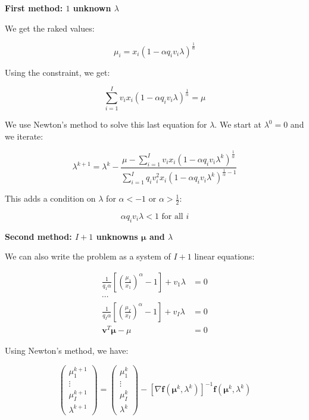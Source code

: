 \documentclass{tex/note}
\begin{document}
\textbf{First method: $1$ unknown $\lambda$}

We get the raked values:

\begin{equation*}
\mu_i = x_i \left( 1 - \alpha q_i v_i \lambda \right)^{\frac{1}{\alpha}}
\end{equation*}

Using the constraint, we get:

\begin{equation*}
\sum_{i = 1}^I v_i x_i \left( 1 - \alpha q_i v_i \lambda \right)^{\frac{1}{\alpha}} = \mu
\end{equation*}

We use Newton's method to solve this last equation for $\lambda$. We start at $\lambda^0 = 0$ and we iterate:

\begin{equation*}
\lambda^{k + 1} = \lambda^k - \frac{\mu - \sum_{i = 1}^I v_i x_i \left( 1 - \alpha q_i v_i \lambda^k \right)^{\frac{1}{\alpha}}}{\sum_{i = 1}^I q_i v_i^2 x_i \left( 1 - \alpha q_i v_i \lambda^k \right)^{\frac{1}{\alpha} - 1}}
\end{equation*}

This adds a condition on $\lambda$ for $\alpha < - 1$ or $\alpha > \frac{1}{2}$:

\begin{equation*}
\alpha q_i v_i \lambda < 1 \text{ for all } i
\end{equation*}

\textbf{Second method: $I + 1$ unknowns $\bm{\mu}$ and $\lambda$}

We can also write the problem as a system of $I + 1$ linear equations:

\begin{align*}
\frac{1}{q_1 \alpha} \left[ \left( \frac{\mu_1}{x_1} \right) ^{\alpha} - 1\right] + v_1 \lambda &= 0 \\
\cdots & \\
\frac{1}{q_I \alpha} \left[ \left( \frac{\mu_I}{x_I} \right) ^{\alpha} - 1\right] + v_I \lambda &= 0 \\
\bm{v}^T \bm{\mu} - \mu &= 0
\end{align*}

Using Newton's method, we have:

\begin{equation*}
\begin{pmatrix} \mu_1^{k + 1} \\ \vdots \\ \mu_I^{k + 1} \\ \lambda^{k + 1} \end{pmatrix} = \begin{pmatrix} \mu_1^k \\ \vdots \\ \mu_I^k \\ \lambda^k \end{pmatrix} - \left[ \nabla \bm{f} \left( \bm{\mu}^k , \lambda^k \right) \right] ^{-1} \bm{f} \left( \bm{\mu}^k , \lambda^k \right)
\end{equation*}
\end{document}

